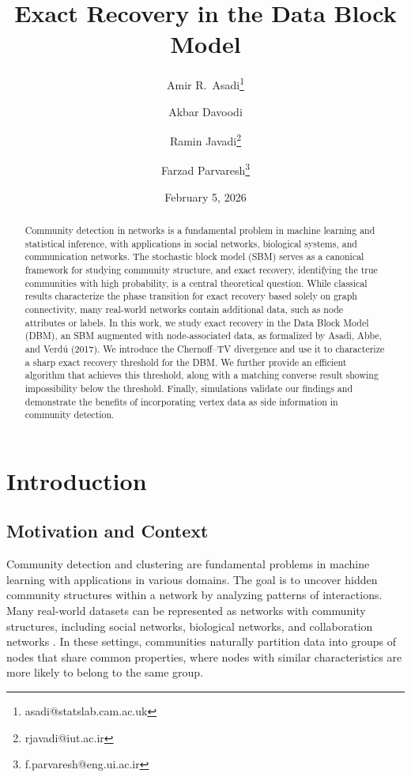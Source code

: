 \documentclass[11pt]{article}
\theoremstyle{plain}
\theoremstyle{definition}
\begin{document}
\title{\textbf{Exact Recovery in the Data Block Model}}

\author[1]{Amir R.~Asadi\thanks{asadi@statslab.cam.ac.uk}}
\author[2]{Akbar Davoodi}
\author[3]{Ramin Javadi\thanks{rjavadi@iut.ac.ir}}
\author[4]{Farzad Parvaresh\thanks{f.parvaresh@eng.ui.ac.ir}}


\date{February 5, 2026}


\maketitle

\begin{abstract}
Community detection in networks is a fundamental problem in machine learning and statistical inference, with applications in social networks, biological systems, and communication networks. The stochastic block model (SBM) serves as a canonical framework for studying community structure, and {exact recovery}, identifying the true communities with high probability, is a central theoretical question. While classical results characterize the phase transition for exact recovery based solely on graph connectivity, many real-world networks contain additional data, such as node attributes or labels. In this work, we study exact recovery in the Data Block Model (DBM), an SBM augmented with node-associated data, as formalized by Asadi, Abbe, and Verd\'{u} (2017). We introduce the Chernoff--TV divergence and use it to characterize a sharp exact recovery threshold for the DBM. We further provide an efficient algorithm that achieves this threshold, along with a matching converse result showing impossibility below the threshold. 
Finally, simulations validate our findings and demonstrate the benefits of incorporating vertex data as side information in community detection.
\end{abstract}



\section{Introduction}
\subsection{Motivation and Context}
Community detection and clustering are fundamental problems in machine learning with applications in various domains. The goal is to uncover hidden community structures within a network by analyzing patterns of interactions. Many real-world datasets can be represented as networks with community structures, including social networks, biological networks, and collaboration networks \citep{girvan2002community, backstrom2006group}. In these settings, communities naturally partition data into groups of nodes that share common properties, where nodes with similar characteristics are more likely to belong to the same group.
\end{document}
